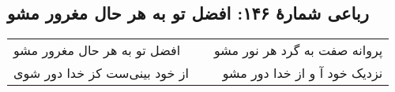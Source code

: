 \begin{center}
\section*{رباعی شمارهٔ ۱۴۶: افضل تو به هر حال مغرور مشو}
\label{sec:146}
\begin{longtable}{l p{0.5cm} r}
افضل تو به هر حال مغرور مشو
&&
پروانه صفت به گرد هر نور مشو
\\
از خود بینی‌ست کز خدا دور شوی
&&
نزدیک خود آ و از خدا دور مشو
\\
\end{longtable}
\end{center}
